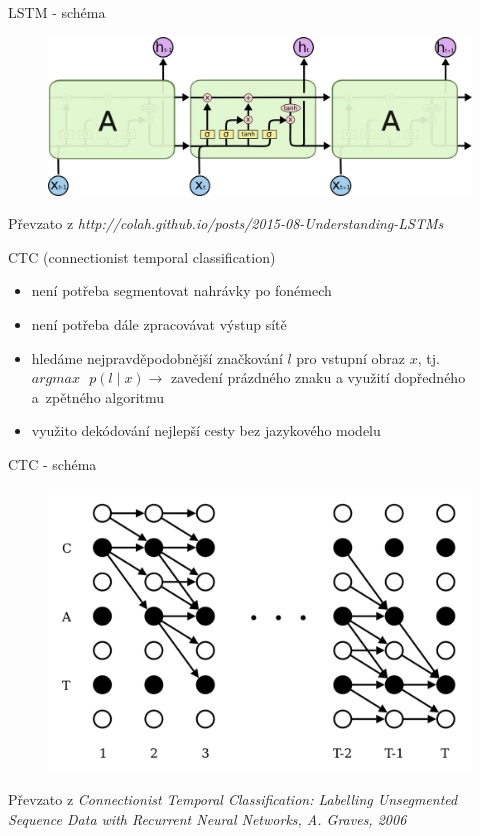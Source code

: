 \documentclass[10pt]{beamer}
\begin{document}
\begin{frame}{LSTM - schéma}
	\begin{figure}
		\includegraphics[width= 0.8\linewidth]{lstm.png}
	\end{figure}
	
	\centering	
	Převzato z \textit{http://colah.github.io/posts/2015-08-Understanding-LSTMs}
\end{frame}

\begin{frame}{CTC (connectionist temporal classification)}
	\begin{itemize}
		\item není potřeba segmentovat nahrávky po fonémech
		\item není potřeba dále zpracovávat výstup sítě
		\item hledáme nejpravděpodobnější značkování $ l $ pro vstupní obraz $ x $, tj. $ argmax \text{ } p(l \mid x) \rightarrow $ zavedení prázdného znaku a využití dopředného a~zpětného algoritmu 
		\item využito dekódování nejlepší cesty bez jazykového modelu
	\end{itemize}
\end{frame}

\begin{frame}{CTC - schéma}
	\begin{figure}
		\includegraphics[width= 0.8\linewidth]{ctc.png}
	\end{figure}
	
	\centering
	Převzato z \textit{Connectionist Temporal Classification: Labelling Unsegmented Sequence Data with Recurrent Neural Networks, A. Graves, 2006}
\end{frame}
\end{document}
